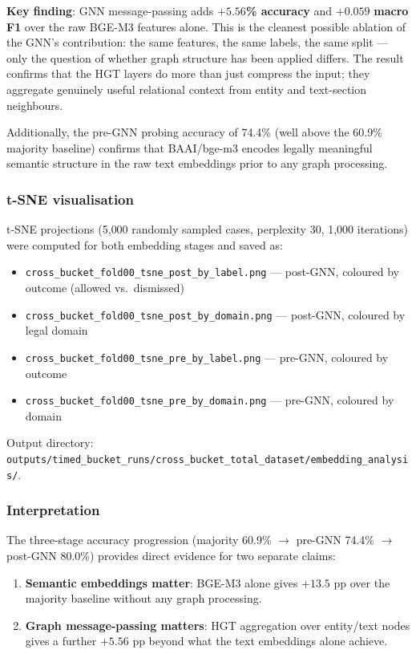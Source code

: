 \documentclass[12pt,a4paper]{article}
\begin{document}
\textbf{Key finding}: GNN message-passing adds $\mathbf{+5.56}$\textbf{\% accuracy} and $\mathbf{+0.059}$ \textbf{macro F1} over the raw BGE-M3 features alone. This is the cleanest possible ablation of the GNN's contribution: the same features, the same labels, the same split — only the question of whether graph structure has been applied differs. The result confirms that the HGT layers do more than just compress the input; they aggregate genuinely useful relational context from entity and text-section neighbours.

Additionally, the pre-GNN probing accuracy of 74.4\% (well above the 60.9\% majority baseline) confirms that BAAI/bge-m3 encodes legally meaningful semantic structure in the raw text embeddings prior to any graph processing.

\subsubsection{t-SNE visualisation}

t-SNE projections (5{,}000 randomly sampled cases, perplexity 30, 1{,}000 iterations) were computed for both embedding stages and saved as:

\begin{itemize}[noitemsep]
  \item \texttt{cross\_bucket\_fold00\_tsne\_post\_by\_label.png} — post-GNN, coloured by outcome (allowed vs.\ dismissed)
  \item \texttt{cross\_bucket\_fold00\_tsne\_post\_by\_domain.png} — post-GNN, coloured by legal domain
  \item \texttt{cross\_bucket\_fold00\_tsne\_pre\_by\_label.png} — pre-GNN, coloured by outcome
  \item \texttt{cross\_bucket\_fold00\_tsne\_pre\_by\_domain.png} — pre-GNN, coloured by domain
\end{itemize}

Output directory: \texttt{outputs/timed\_bucket\_runs/cross\_bucket\_total\_dataset/\allowbreak embedding\_analysis/}.

\subsubsection{Interpretation}

The three-stage accuracy progression (majority 60.9\% $\to$ pre-GNN 74.4\% $\to$ post-GNN 80.0\%) provides direct evidence for two separate claims:

\begin{enumerate}[noitemsep]
  \item \textbf{Semantic embeddings matter}: BGE-M3 alone gives $+13.5$ pp over the majority baseline without any graph processing.
  \item \textbf{Graph message-passing matters}: HGT aggregation over entity/text nodes gives a further $+5.56$ pp beyond what the text embeddings alone achieve.
\end{enumerate}
\end{document}
